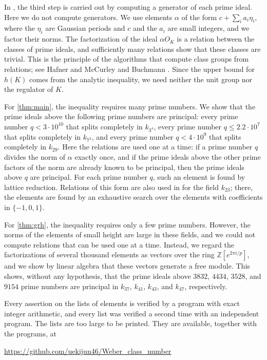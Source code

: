 \documentclass[11pt]{amsart}
\theoremstyle{plain}
\theoremstyle{definition}
\begin{document}
In \cite{Mi15b}, the third step is carried out by computing a generator of each prime ideal.
Here we do not compute generators.
We use elements $\alpha$ of the form $c + \sum_i a_i \eta_i$, where the $\eta_i$ are Gaussian periods and $c$ and the $a_i$ are small integers, and we factor their norms.
The factorization of the ideal $\alpha O_K$ is a relation between the classes of prime ideals, and sufficiently many relations show that these classes are trivial.
This is the principle of the algorithms that compute class groups from relations; see Hafner and McCurley \cite{HM89} and Buchmann \cite{Bu90}.
Since the upper bound for $h(K)$ comes from the analytic inequality, we need neither the unit group nor the regulator of $K$.

For \cref{thm:main}, the inequality requires many prime numbers.
We show that the prime ideals above the following prime numbers are principal: every prime number $q < 3 \cdot 10^{10}$ that splits completely in $k_{3^4}$, every prime number $q \le 2.2 \cdot 10^7$ that splits completely in $k_{7^2}$, and every prime number $q < 4 \cdot 10^9$ that splits completely in $k_{29}$.
Here the relations are used one at a time: if a prime number $q$ divides the norm of $\alpha$ exactly once, and if the prime ideals above the other prime factors of the norm are already known to be principal, then the prime ideals above $q$ are principal.
For each prime number $q$, such an element is found by lattice reduction.
Relations of this form are also used in \cite{Ch26} for the field $k_{23}$; there, the elements are found by an exhaustive search over the elements with coefficients in $\{-1, 0, 1\}$.

For \cref{thm:grh}, the inequality requires only a few prime numbers.
However, the norms of the elements of small height are large in these fields, and we could not compute relations that can be used one at a time.
Instead, we regard the factorizations of several thousand elements as vectors over the ring $\mathbb{Z}[e^{2\pi i/p}]$, and we show by linear algebra that these vectors generate a free module.
This shows, without any hypothesis, that the prime ideals above $3832$, $4434$, $3528$, and $9154$ prime numbers are principal in $k_{37}$, $k_{41}$, $k_{43}$, and $k_{47}$, respectively.

Every assertion on the lists of elements is verified by a program with exact integer arithmetic, and every list was verified a second time with an independent program.
The lists are too large to be printed.
They are available, together with the programs, at
\begin{center}
\url{https://github.com/uekijun46/Weber_class_number}
\end{center}
\end{document}
